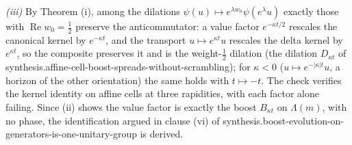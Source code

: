 \emph{(iii)} By Theorem (i), among the dilations $\psi(u) \mapsto e^{\lambda w_{0}}\psi(e^{\lambda}u)$ exactly those with $\operatorname{Re}w_{0} = \tfrac12$ preserve the anticommutator: a value factor $e^{-\kappa t/2}$ rescales the canonical kernel by $e^{-\kappa t}$, and the transport $u \mapsto e^{\kappa t}u$ rescales the delta kernel by $e^{\kappa t}$, so the composite preserves it and is the weight-$\tfrac12$ dilation (the dilation $D_{\kappa t}$ of synthesis.affine-cell-boost-spreads-without-scrambling); for $\kappa < 0$ ($u \mapsto e^{-|\kappa|t}u$, a horizon of the other orientation) the same holds with $t \mapsto -t$. The check verifies the kernel identity on affine cells at three rapidities, with each factor alone failing. Since (ii) shows the value factor is exactly the boost $B_{\kappa t}$ on $\Lambda(m)$, with no phase, the identification argued in clause (vi) of synthesis.boost-evolution-on-generators-is-one-unitary-group is derived.

